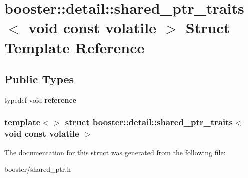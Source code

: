 \section{booster\-:\-:detail\-:\-:shared\-\_\-ptr\-\_\-traits$<$ void const volatile $>$ \-Struct \-Template \-Reference}
\label{structbooster_1_1detail_1_1shared__ptr__traits_3_01void_01const_01volatile_01_4}
\subsection*{\-Public \-Types}
\begin{DoxyCompactItemize}
\item 
typedef void {\bfseries reference}\label{structbooster_1_1detail_1_1shared__ptr__traits_3_01void_01const_01volatile_01_4_a604c7d14d2b29328f8ceb2485489b938}

\end{DoxyCompactItemize}
\subsubsection*{template$<$$>$ struct booster\-::detail\-::shared\-\_\-ptr\-\_\-traits$<$ void const volatile $>$}



\-The documentation for this struct was generated from the following file\-:\begin{DoxyCompactItemize}
\item 
booster/shared\-\_\-ptr.\-h\end{DoxyCompactItemize}
